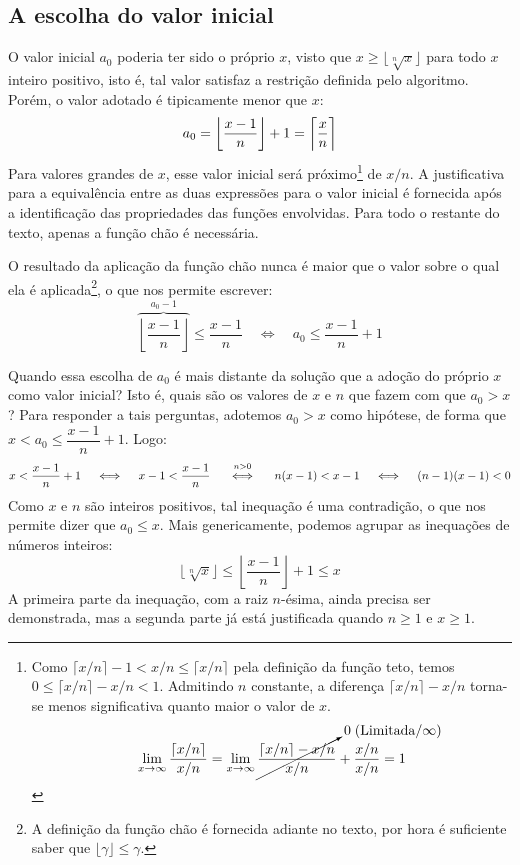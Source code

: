 \subsection*{A escolha do valor inicial}

O valor inicial $a_0$ poderia ter sido o próprio $x$,
visto que $x \ge \lfloor \sqrt[n]{x} \rfloor$
para todo $x$ inteiro positivo,
isto é, tal valor satisfaz a restrição definida pelo algoritmo.
Porém, o valor adotado é tipicamente menor que $x$:
\[
  a_0 = \left\lfloor \dfrac{x - 1}{n} \right\rfloor + 1
      = \left\lceil \dfrac{x\vphantom{l}}{n} \right\rceil
\]
Para valores grandes de $x$, esse valor inicial será próximo\footnote{
  Como $\lceil x/n \rceil - 1 < x/n \le \lceil x/n \rceil$
  pela definição da função teto,
  temos $0 \le \lceil x/n \rceil - x/n < 1$.
  Admitindo $n$ constante, a diferença $\lceil x/n \rceil - x/n$
  torna-se menos significativa quanto maior o valor de $x$.
  \[
    \lim_{x\to\infty} \dfrac{\lceil x/n \rceil}{x/n}
    =
    \lim_{x\to\infty} \cancelto{0\;(\text{Limitada}/\infty)}{
                        \dfrac{\lceil x/n \rceil - x/n}{x/n}
                      } +
                      \dfrac{x/n}{x/n}
    = 1
  \]
}
de $x/n$.
A justificativa para a equivalência
entre as duas expressões para o valor inicial
é fornecida após a identificação das propriedades
das funções envolvidas.
Para todo o restante do texto, apenas a função chão é necessária.

O resultado da aplicação da função chão
nunca é maior que o valor sobre o qual ela é aplicada\footnote{
  A definição da função chão é fornecida adiante no texto,
  por hora é suficiente saber que $\lfloor \gamma \rfloor \le \gamma$.
},
o que nos permite escrever:
\[
  \overbrace{\left\lfloor \dfrac{x - 1}{n} \right\rfloor}^{a_0 - 1}
  \le \dfrac{x - 1}{n}
  \quad\iff\quad
  a_0 \le \dfrac{x - 1}{n} + 1
\]

Quando essa escolha de $a_0$
é mais distante da solução
que a adoção do próprio $x$ como valor inicial?
Isto é, quais são os valores de $x$ e $n$
que fazem com que $a_0 > x$?
Para responder a tais perguntas,
adotemos $a_0 > x$ como hipótese,
de forma que $x < a_0 \le \dfrac{x - 1}{n} + 1$.
Logo:
\[
  x < \dfrac{x - 1}{n} + 1
  \quad\iff\quad
  x - 1 < \dfrac{x - 1}{n}
  \quad\stackfirst{n > 0}{\iff}\quad
  n(x - 1) < x - 1
  \quad\iff\quad
  (n - 1)(x - 1) < 0
\]
Como $x$ e $n$ são inteiros positivos,
tal inequação é uma contradição,
o que nos permite dizer que $a_0 \le x$.
Mais genericamente,
podemos agrupar as inequações de números inteiros:
\[
  \lfloor \sqrt[n]{x} \rfloor
  \le
  \left\lfloor \dfrac{x - 1}{n} \right\rfloor + 1
  \le
  x
\]
A primeira parte da inequação, com a raiz $n$-ésima,
ainda precisa ser demonstrada,
mas a segunda parte já está justificada quando $n \ge 1$ e $x \ge 1$.

